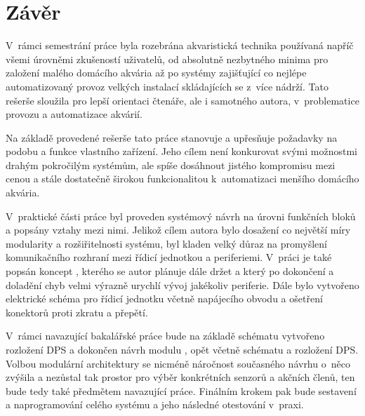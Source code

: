 \chapter*{Závěr}
{}

V~rámci semestrání práce byla rozebrána akvaristická technika používaná napříč všemi úrovněmi zkušeností uživatelů, od absolutně nezbytného minima pro založení malého domácího akvária až po systémy zajišťující co nejlépe automatizovaný provoz velkých instalací skládajících se z~více nádrží. Tato rešerše sloužila pro lepší orientaci čtenáře, ale i samotného autora, v~problematice provozu a automatizace akvárií. 

Na základě provedené rešerše tato práce stanovuje a upřesňuje požadavky na podobu a funkce vlastního zařízení. Jeho cílem není konkurovat svými možnostmi drahým pokročilým systémům, ale spíše dosáhnout jistého kompromisu mezi cenou a stále dostatečně širokou funkcionalitou k~automatizaci menšího domácího akvária.

V~praktické části práce byl proveden systémový návrh na úrovni funkčních bloků a popsány vztahy mezi nimi. Jelikož cílem autora bylo dosažení co největší míry modularity a rozšiřitelnosti systému, byl kladen velký důraz na promyšlení komunikačního rozhraní mezi řídicí jednotkou a periferiemi. V~práci je také popsán koncept , kterého se autor plánuje dále držet a který po dokončení a doladění chyb velmi výrazně urychlí vývoj jakékoliv periferie. Dále bylo vytvořeno elektrické schéma pro řídicí jednotku včetně napájecího obvodu a ošetření konektorů proti zkratu a přepětí. 

V~rámci navazující bakalářské práce bude na základě schématu vytvořeno rozložení DPS a dokončen návrh modulu , opět včetně schématu a rozložení DPS. Volbou modulární architektury se nicméně náročnost současného návrhu o~něco zvýšila a nezůstal tak prostor pro výběr konkrétních senzorů a akčních členů, ten bude tedy také předmětem navazující práce. Finálním krokem pak bude sestavení a naprogramování celého systému a jeho následné otestování v~praxi.
